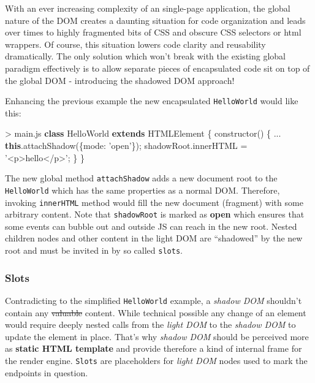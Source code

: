 \documentclass[]{article}
\newenvironment{Shaded}{}{}
\newcommand{\KeywordTok}[1]{\textcolor[rgb]{0.00,0.44,0.13}{\textbf{{#1}}}}
\newcommand{\DataTypeTok}[1]{\textcolor[rgb]{0.56,0.13,0.00}{{#1}}}
\newcommand{\StringTok}[1]{\textcolor[rgb]{0.25,0.44,0.63}{{#1}}}
\newcommand{\VariableTok}[1]{\textcolor[rgb]{0.10,0.09,0.49}{{#1}}}
\newcommand{\OperatorTok}[1]{\textcolor[rgb]{0.40,0.40,0.40}{{#1}}}
\newcommand{\AttributeTok}[1]{\textcolor[rgb]{0.49,0.56,0.16}{{#1}}}
\newcommand{\NormalTok}[1]{{#1}}
\begin{document}
With an ever increasing complexity of an single-page application, the
global nature of the DOM creates a daunting situation for code
organization and leads over times to highly fragmented bits of CSS and
obscure CSS selectors or html wrappers. Of course, this situation lowers
code clarity and reusability dramatically. The only solution which won't
break with the existing global paradigm effectively is to allow separate
pieces of encapsulated code sit on top of the global DOM - introducing
the shadowed DOM approach!

Enhancing the previous example the new encapsulated \texttt{HelloWorld}
would like this:

\begin{Shaded}
\begin{Highlighting}[]
\OperatorTok{>} \VariableTok{main}\NormalTok{.}\AttributeTok{js}
\KeywordTok{class} \NormalTok{HelloWorld }\KeywordTok{extends} \NormalTok{HTMLElement }\OperatorTok{\{}
 \AttributeTok{constructor}\NormalTok{() }\OperatorTok{\{}
  \NormalTok{...}
  \KeywordTok{this}\NormalTok{.}\AttributeTok{attachShadow}\NormalTok{(}\OperatorTok{\{}\DataTypeTok{mode}\OperatorTok{:} \StringTok{'open'}\OperatorTok{\}}\NormalTok{)}\OperatorTok{;}
  \VariableTok{shadowRoot}\NormalTok{.}\AttributeTok{innerHTML} \OperatorTok{=} \StringTok{'<p>hello</p>'}\OperatorTok{;}
 \OperatorTok{\}}
\OperatorTok{\}}
\end{Highlighting}
\end{Shaded}

The new global method \texttt{attachShadow} adds a new document root to
the \texttt{HelloWorld} which has the same properties as a normal DOM.
Therefore, invoking \texttt{innerHTML} method would fill the new
document (fragment) with some arbitrary content. Note that
\texttt{shadowRoot} is marked as \textbf{open} which ensures that some
events can bubble out and outside JS can reach in the new root. Nested
children nodes and other content in the light DOM are ``shadowed'' by
the new root and must be invited in by so called \texttt{slots}.

\subsubsection{Slots}\label{slots}

Contradicting to the simplified \texttt{HelloWorld} example, a
\emph{shadow DOM} shouldn't contain any \sout{valuable} content. While
technical possible any change of an element would require deeply nested
calls from the \emph{light DOM} to the \emph{shadow DOM} to update the
element in place. That's why \emph{shadow DOM} should be perceived more
as \textbf{static HTML template} and provide therefore a kind of
internal frame for the render engine. \texttt{Slots} are placeholders
for \emph{light DOM} nodes used to mark the endpoints in question.
\end{document}
